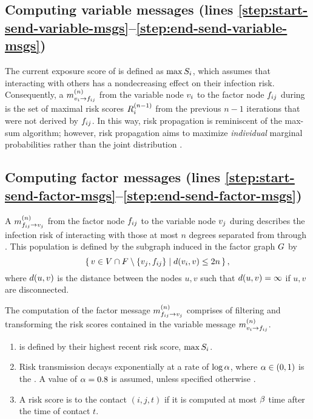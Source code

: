 \subsection{Computing variable messages (lines \ref{step:start-send-variable-msgs}--\ref{step:end-send-variable-msgs})}

The current exposure score of  is defined as $\max S_i$, which assumes that interacting with others has a nondecreasing effect on their infection risk. Consequently, a  $\vVariableMsg[n]{i}{ij}$ from the variable node $\vVariable[i]$ to the factor node $\vFactor[ij]$ during  is the set of maximal risk scores $\iScores{i}{n - 1}$ from the previous $n - 1$ iterations that were not derived by $\vFactor[ij]$. In this way, risk propagation is reminiscent of the max-sum algorithm; however, risk propagation aims to maximize \emph{individual} marginal probabilities rather than the joint distribution \cite[pp. 411--415]{Bishop2006}.

\subsection{Computing factor messages (lines \ref{step:start-send-factor-msgs}--\ref{step:end-send-factor-msgs})}

A  $\vFactorMsg[n]{ij}{j}$ from the factor node $\vFactor[ij]$ to the variable node $\vVariable[j]$ during  describes the infection risk of interacting with those at most $n$ degrees separated from  through . This population is defined by the subgraph induced in the factor graph $G$ by
%
\begin{equation*}
    \setBuilder{\vVariable \in \vVariables \cap \vFactors \setminus \{\vVariable[j], \vFactor[ij]\}}{\dist(\vVariable[i], \vVariable) \leq 2n},
\end{equation*}
%
where $d(u, v)$ is the distance between the nodes $u, v$ such that $d(u, v) = \infty$ if $u, v$ are disconnected. 

The computation of the factor message $\vFactorMsg[n]{ij}{j}$ comprises of filtering and transforming the risk scores contained in the variable message $\vVariableMsg[n]{i}{ij}$.

\begin{enumerate}
    \item {} is defined by their highest recent risk score, $\max S_i$.
    \item Risk transmission decays exponentially at a rate of $\log \alpha$, where $\alpha \in (0, 1)$ is the . A value of $\alpha = 0.8$ is assumed, unless specified otherwise \cite{Hamner2020}.
    \item A risk score is  to the contact $(i, j, t)$ if it is computed at most $\beta$ time after the time of contact $t$.
\end{enumerate}

